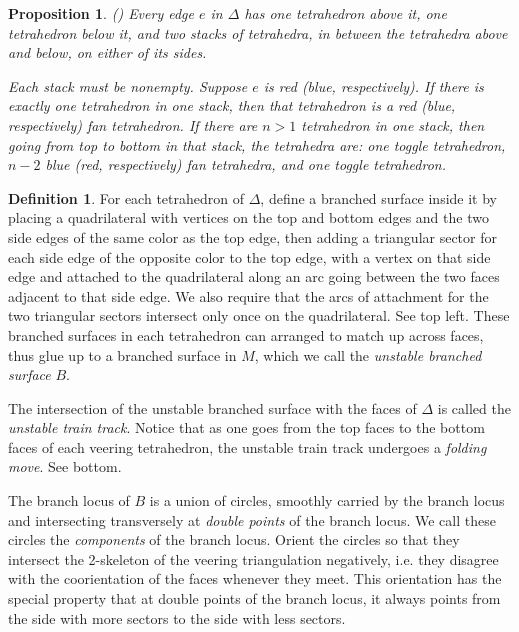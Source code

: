 \documentclass[12pt]{amsart}
\newtheorem{prop}[thm]{Proposition}
\theoremstyle{definition}
\newtheorem{defn}[thm]{Definition}
\numberwithin{equation}{section}
\begin{document}
\begin{prop}(\cite[Observation 2.6]{FG13}) \label{prop:fantet}
Every edge $e$ in $\Delta$ has one tetrahedron above it, one tetrahedron below it, and two stacks of tetrahedra, in between the tetrahedra above and below, on either of its sides.

Each stack must be nonempty. Suppose $e$ is red (blue, respectively). If there is exactly one tetrahedron in one stack, then that tetrahedron is a red (blue, respectively) fan tetrahedron. If there are $n>1$ tetrahedron in one stack, then going from top to bottom in that stack, the tetrahedra are: one toggle tetrahedron, $n-2$ blue (red, respectively) fan tetrahedra, and one toggle tetrahedron. 
\end{prop}

\begin{defn} \label{defn:branchsurf}
For each tetrahedron of $\Delta$, define a branched surface inside it by placing a quadrilateral with vertices on the top and bottom edges and the two side edges of the same color as the top edge, then adding a triangular sector for each side edge of the opposite color to the top edge, with a vertex on that side edge and attached to the quadrilateral along an arc going between the two faces adjacent to that side edge. We also require that the arcs of attachment for the two triangular sectors intersect only once on the quadrilateral. See  top left. These branched surfaces in each tetrahedron can arranged to match up across faces, thus glue up to a branched surface in $M$, which we call the \textit{unstable branched surface} $B$.

The intersection of the unstable branched surface with the faces of $\Delta$ is called the \textit{unstable train track}. Notice that as one goes from the top faces to the bottom faces of each veering tetrahedron, the unstable train track undergoes a \textit{folding move}. See  bottom. 

The branch locus of $B$ is a union of circles, smoothly carried by the branch locus and intersecting transversely at \textit{double points} of the branch locus. We call these circles the \textit{components} of the branch locus. Orient the circles so that they intersect the 2-skeleton of the veering triangulation negatively, i.e. they disagree with the coorientation of the faces whenever they meet. This orientation has the special property that at double points of the branch locus, it always points from the side with more sectors to the side with less sectors.
\end{defn}
\end{document}
